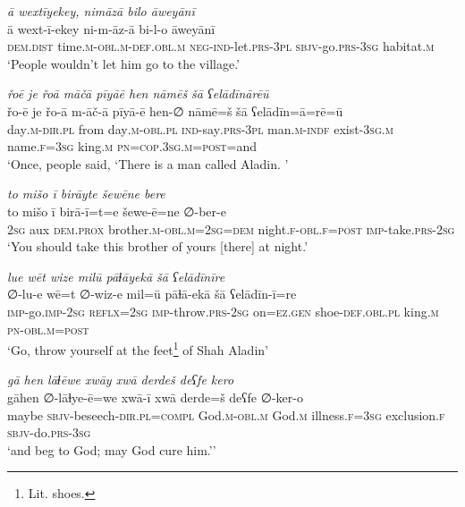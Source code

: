 \ea \label{DG.23}
\textit{ā wextīyekey, nimāzā bilo āweyānī} \\ 
\gll ā wext-ī-ekey ni-m-āz-ā bi-l-o āweyānī \\ 
 \textsc{dem.dist} time\textsc{.m}\textsc{-obl}\textsc{.m}\textsc{-def}\textsc{.obl}\textsc{.m} \textsc{neg-}\textsc{ind-}let\textsc{.prs}\textsc{-3pl} \textsc{sbjv-}go\textsc{.prs}\textsc{-3sg} habitat\textsc{\textsc{.m}} \\ 
\glt `People wouldn’t let him go to the village.'
\z 
 
\ea \label{DG.24}
\textit{řoē je řoā māčā pīyāē hen nāmēš šā ʕelādīnārēū} \\ 
\gll řo-ē je řo-ā m-āč-ā pīyā-ē hen-∅ nāmē=š šā ʕelādīn=ā=rē=ū \\ 
 day\textsc{.m}\textsc{-dir}\textsc{.pl} from day\textsc{.m}\textsc{-obl}\textsc{.pl} \textsc{ind-}say\textsc{.prs}\textsc{-3pl} man\textsc{.m}\textsc{-indf} exist\textsc{-3sg}\textsc{.m} name\textsc{\textsc{.f}}\textsc{=3sg} king\textsc{.m} \textsc{pn}\textsc{=cop}\textsc{.3sg}\textsc{.m}\textsc{=\textsc{post}}=and \\ 
\glt `Once, people said, ‘There is a man called Aladin. '
\z 
 
\ea \label{DG.26}
\textit{to mišo ī birāyte šewēne bere} \\ 
\gll to mišo ī birā-ī=t=e šewe-ē=ne ∅-ber-e \\ 
 \textsc{2sg} aux \textsc{dem.prox} brother\textsc{.m}\textsc{-obl}\textsc{.m}\textsc{=\textsc{2sg}}\textsc{=dem} night\textsc{\textsc{.f}}\textsc{-obl}\textsc{\textsc{.f}}\textsc{=\textsc{post}} \textsc{imp-}take\textsc{.prs}-\textsc{2sg} \\ 
\glt `You should take this brother of yours [there] at night.'
\z 
 
\ea \label{DG.27}
\textit{lue wēt wize milū pāɫāyekā šā ʕelādīnīre} \\ 
\gll ∅-lu-e wē=t ∅-wiz-e mil=ū pāɫā-ekā šā ʕelādīn-ī=re \\ 
 \textsc{imp-}go.\textsc{imp-}\textsc{2sg} \textsc{reflx}\textsc{=\textsc{2sg}} \textsc{imp-}throw\textsc{.prs}-\textsc{2sg} on\textsc{=ez}\textsc{.gen} shoe\textsc{-def}\textsc{.obl}\textsc{.pl} king\textsc{.m} \textsc{pn}\textsc{-obl}\textsc{.m}\textsc{=\textsc{post}} \\ 
\glt `Go, throw yourself at the feet\footnote{Lit. shoes.} of Shah Aladin'
\z 
 
\ea \label{DG.28}
\textit{gā hen lāɫēwe xwāy xwā derdeš deʕfe kero} \\ 
\gll gāhen ∅-lāɫye-ē=we xwā-ī xwā derde=š deʕfe ∅-ker-o \\ 
 maybe \textsc{sbjv-}beseech\textsc{-dir}\textsc{.pl}\textsc{=\textsc{compl}} God\textsc{.m}\textsc{-obl}\textsc{.m} God\textsc{.m} illness\textsc{\textsc{.f}}\textsc{=3sg} exclusion\textsc{\textsc{.f}} \textsc{sbjv-}do\textsc{.prs}\textsc{-3sg} \\ 
\glt `and beg to God; may God cure him.’'
\z 
 
